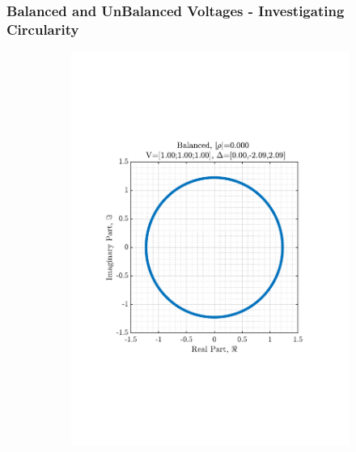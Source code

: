 \documentclass[12pt]{article}
\numberwithin{equation}{section}
\begin{document}
		\subsubsection{Balanced and UnBalanced Voltages - Investigating Circularity}
		\vspace*{-\baselineskip}
			\begin{figure}[H]
				\centering
				\begin{subfigure}{0.45\textwidth}
					\centering
					\includegraphics[trim={2.2cm 6.8cm 3.00cm  6.2cm}, clip, width=\textwidth]{../MATLAB/figures/q3_1c_fig01.pdf} 
					\captionsetup{justification=centering}
				\end{subfigure}
				\begin{subfigure}{0.45\textwidth}
					\centering

\end{subfigure}
\end{figure}
\end{document}
